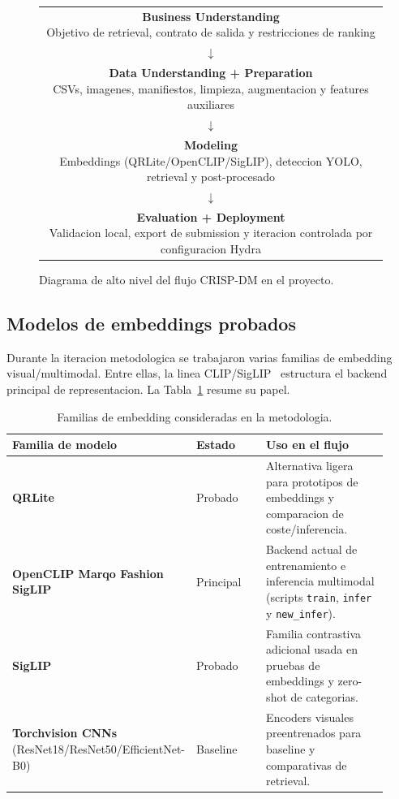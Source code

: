 \begin{figure}[h]
  \centering
  \small
  \begin{tabular}{c}
    \fbox{\parbox{0.92\linewidth}{\textbf{Business Understanding}\\Objetivo de retrieval, contrato de salida y restricciones de ranking}}\\[2pt]
    $\downarrow$\\[2pt]
    \fbox{\parbox{0.92\linewidth}{\textbf{Data Understanding + Preparation}\\CSVs, imagenes, manifiestos, limpieza, augmentacion y features auxiliares}}\\[2pt]
    $\downarrow$\\[2pt]
    \fbox{\parbox{0.92\linewidth}{\textbf{Modeling}\\Embeddings (QRLite/OpenCLIP/SigLIP), deteccion YOLO, retrieval y post-procesado}}\\[2pt]
    $\downarrow$\\[2pt]
    \fbox{\parbox{0.92\linewidth}{\textbf{Evaluation + Deployment}\\Validacion local, export de submission y iteracion controlada por configuracion Hydra}}
  \end{tabular}
  \caption{Diagrama de alto nivel del flujo CRISP-DM en el proyecto.}
  \label{fig:crisp-flow}
\end{figure}

\subsection{Modelos de embeddings probados}

Durante la iteracion metodologica se trabajaron varias familias de embedding visual/multimodal. Entre ellas, la linea CLIP/SigLIP~\cite{radford2021clip,zhai2023siglip} estructura el backend principal de representacion. La Tabla~\ref{tab:embedding-families} resume su papel.

\begin{table}[h]
  \centering
  \small
  \begin{tabular}{p{0.30\linewidth} p{0.22\linewidth} p{0.40\linewidth}}
    \toprule
    \textbf{Familia de modelo} & \textbf{Estado} & \textbf{Uso en el flujo} \\
    \midrule
    \textbf{QRLite} & Probado & Alternativa ligera para prototipos de embeddings y comparacion de coste/inferencia. \\
    \textbf{OpenCLIP Marqo Fashion SigLIP} & Principal & Backend actual de entrenamiento e inferencia multimodal (scripts \texttt{train}, \texttt{infer} y \texttt{new\_infer}). \\
    \textbf{SigLIP} & Probado & Familia contrastiva adicional usada en pruebas de embeddings y zero-shot de categorias. \\
    \textbf{Torchvision CNNs} (ResNet18/ResNet50/EfficientNet-B0) & Baseline & Encoders visuales preentrenados para baseline y comparativas de retrieval. \\
    \bottomrule
  \end{tabular}
  \caption{Familias de embedding consideradas en la metodologia.}
  \label{tab:embedding-families}
\end{table}

